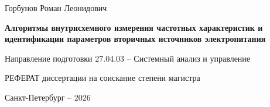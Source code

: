 \documentclass[a4paper, 14pt]{extarticle}
\begin{document}
    \thispagestyle{empty}	
    \fontsize{14pt}{21pt}\selectfont

    \vspace{20mm}

    \hfill
    \begin{minipage}[t][][t]{0.4\linewidth} %
        \hfill{}
    \end{minipage}

    \vspace{30mm}
    \begin{center}
        {\large Горбунов Роман Леонидович}
    \end{center}

    \vspace{5mm}
    \begin{center}
        {\bf \large Алгоритмы внутрисхемного измерения частотных характеристик и идентификации параметров вторичных источников электропитания
            \par}
        
        \vspace{10mm}
        {%
            Направление подготовки 27.04.03 -- Системный анализ и управление
        }
        
        \vspace{10mm}
        РЕФЕРАТ        
        диссертации на соискание степени магистра
    \end{center}

    \vfill
    \begin{center}
        {Санкт-Петербург -- 2026}
    \end{center}
    
    \newpage
    
\end{document}
